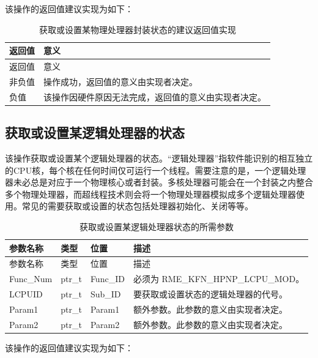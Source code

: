 该操作的返回值建议实现为如下：

\begin{xltabular}{\textwidth}{@{}>{\hsize\raggedright\arraybackslash}X>{\hsize\raggedright\arraybackslash}X@{}}
\caption{获取或设置某物理处理器封装状态的建议返回值实现}\label{tab:8-37-get-or-set-physical-processor-package-state-suggested-return-values}\\
\toprule
返回值 & 意义\tabularnewline
\endfirsthead
\toprule
返回值 & 意义\tabularnewline
\midrule
\endhead
\bottomrule
\endlastfoot
    非负值 & 操作成功，返回值的意义由实现者决定。\tabularnewline
    负值 & 该操作因硬件原因无法完成，返回值的意义由实现者决定。\tabularnewline
\end{xltabular}

\subsection{获取或设置某逻辑处理器的状态}\label{subsec:8-get-or-set-logical-processor-state}

该操作获取或设置某个逻辑处理器的状态。``逻辑处理器''指软件能识别的相互独立的CPU核，每个核在任何时间仅可运行一个线程。需要注意的是，一个逻辑处理器未必总是对应于一个物理核心或者封装。多核处理器可能会在一个封装之内整合多个物理处理器，而超线程技术则会将一个物理处理器模拟成多个逻辑处理器使用。常见的需要获取或设置的状态包括处理器初始化、关闭等等。

\begin{xltabular}{\textwidth}{@{}>{\hsize\raggedright\arraybackslash}X>{\hsize\raggedright\arraybackslash}X>{\hsize\raggedright\arraybackslash}X>{\hsize\raggedright\arraybackslash}X@{}}
\caption{获取或设置某逻辑处理器状态的所需参数}\label{tab:8-38-get-or-set-logical-processor-state-parameters}\\
\toprule
参数名称 & 类型 & 位置 & 描述\tabularnewline
\endfirsthead
\toprule
参数名称 & 类型 & 位置 & 描述\tabularnewline
\midrule
\endhead
\bottomrule
\endlastfoot
Func\_Num & ptr\_t & Func\_ID & 必须为 RME\_KFN\_HPNP\_LCPU\_MOD。\tabularnewline
LCPUID & ptr\_t & Sub\_ID &
要获取或设置状态的逻辑处理器的代号。\tabularnewline
Param1 & ptr\_t & Param1 &
额外参数。此参数的意义由实现者决定。\tabularnewline
Param2 & ptr\_t & Param2 &
额外参数。此参数的意义由实现者决定。\tabularnewline
\end{xltabular}

该操作的返回值建议实现为如下：

